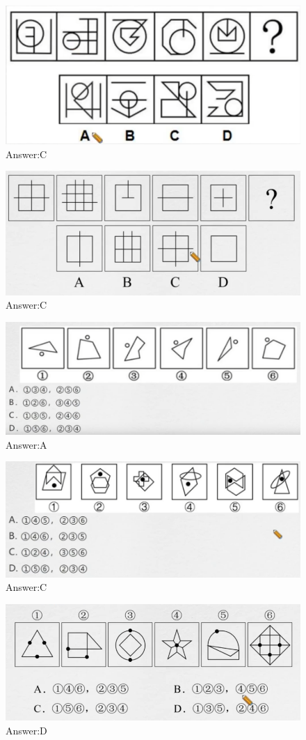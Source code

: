 \documentclass{article}
\numberwithin{equation}{section}						%
\numberwithin{figure}{section}							%
\begin{document}
\begin{sloppypar}
\begin{figure}[H]
     \centering
     \includegraphics[width=0.5\linewidth]{47.png}
		\caption{Answer:C}
\end{figure}


\begin{figure}[H]
     \centering
     \includegraphics[width=0.5\linewidth]{48.png}
		\caption{Answer:C}
\end{figure}


\begin{figure}[H]
     \centering
     \includegraphics[width=0.55\linewidth]{49.png}
		\caption{Answer:A}
\end{figure}


\begin{figure}[H]
     \centering
     \includegraphics[width=0.6\linewidth]{50.png}
		\caption{Answer:C}
\end{figure}


\begin{figure}[H]
     \centering
     \includegraphics[width=0.6\linewidth]{51.png}
		\caption{Answer:D}
\end{figure}



\end{sloppypar}
\end{document}
